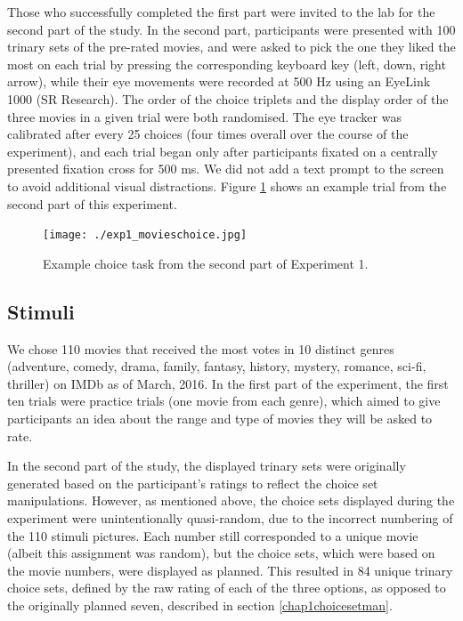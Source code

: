 \documentclass[11pt,a4paper]{article}
\begin{document}
Those who successfully completed the first part were invited to the lab for the second part of the study. In the second part, participants were presented with 100 trinary sets of the pre-rated movies, and were asked to pick the one they liked the most on each trial by pressing the corresponding keyboard key (left, down, right arrow), while their eye movements were recorded at 500 Hz using an EyeLink 1000 (SR Research). The order of the choice triplets and the display order of the three movies in a given trial were both randomised. The eye tracker was calibrated after every 25 choices (four times overall over the course of the experiment), and each trial began only after participants fixated on a centrally presented fixation cross for 500 ms. We did not add a text prompt to the screen to avoid additional visual distractions. Figure \ref{fig:exp1_movieschoice} shows an example trial from the second part of this experiment.

\begin{figure}[htb!]
\captionsetup{justification=centering}
\centering
\caption{Example choice task from the second part of Experiment 1. }
\texttt{[image: ./exp1\_movieschoice.jpg]}
\label{fig:exp1_movieschoice}
\end{figure}



\subsection{Stimuli}

We chose 110 movies that received the most votes in 10 distinct genres (adventure, comedy, drama, family, fantasy, history, mystery, romance, sci-fi, thriller) on IMDb as of March, 2016. In the first part of the experiment, the first ten trials were practice trials (one movie from each genre), which aimed to give participants an idea about the range and type of movies they will be asked to rate. 

In the second part of the study, the displayed trinary sets were originally generated based on the participant's ratings to reflect the choice set manipulations. However, as mentioned above, the choice sets displayed during the experiment were unintentionally quasi-random, due to the incorrect numbering of the 110 stimuli pictures. Each number still corresponded to a unique movie (albeit this assignment was random), but the choice sets, which were based on the movie numbers, were displayed as planned. This resulted in 84 unique trinary choice sets, defined by the raw rating of each of the three options, as opposed to the originally planned seven, described in section \ref{chap1choicesetman}. 
\end{document}
